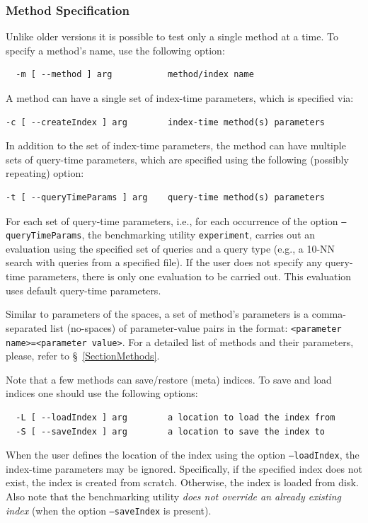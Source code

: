 \documentclass[runningheads,a4paper]{llncs}
\newcommand{\ttt}[1]{\texttt{#1}}
\begin{document}
{\subsubsection{Method Specification}
Unlike older versions it is possible to test only a single method at a time.
To specify a method's name, use the following option:
\begin{verbatim}
  -m [ --method ] arg           method/index name
\end{verbatim}
A method can have a single set of index-time parameters, which is specified
via:
\begin{verbatim}
-c [ --createIndex ] arg        index-time method(s) parameters
\end{verbatim}
In addition to the set of index-time parameters,
the method can have multiple sets of query-time parameters, which are specified
using the following (possibly repeating) option:
\begin{verbatim}
-t [ --queryTimeParams ] arg    query-time method(s) parameters
\end{verbatim}
For each set of query-time parameters, i.e., for each occurrence of the option \ttt{--queryTimeParams}, 
the benchmarking utility \ttt{experiment},
carries out an evaluation using the specified set of queries and a query type (e.g., a 10-NN search with
queries from a specified file). 
If the user does not specify any query-time parameters, there is only one evaluation to be carried out.
This evaluation uses default query-time parameters.

Similar to parameters of the spaces, 
a set of method's parameters is a comma-separated list (no-spaces)
of parameter-value pairs in the format:
\ttt{<parameter name>=<parameter value>}.
For a detailed list of methods and their parameters, please, refer to \S~\ref{SectionMethods}.

Note that a few methods can save/restore (meta) indices. To save and load indices
one should use the following options:
\begin{verbatim}
  -L [ --loadIndex ] arg        a location to load the index from 
  -S [ --saveIndex ] arg        a location to save the index to
\end{verbatim}
When the user defines the location of the index using the option \ttt{--loadIndex}, 
the index-time parameters may be ignored. 
Specifically, if the specified index does not exist, the index is created from scratch.
Otherwise, the index is loaded from disk.
Also note that the benchmarking utility \emph{does not override an already existing index} (when the option \ttt{--saveIndex} is present).

}
\end{document}
